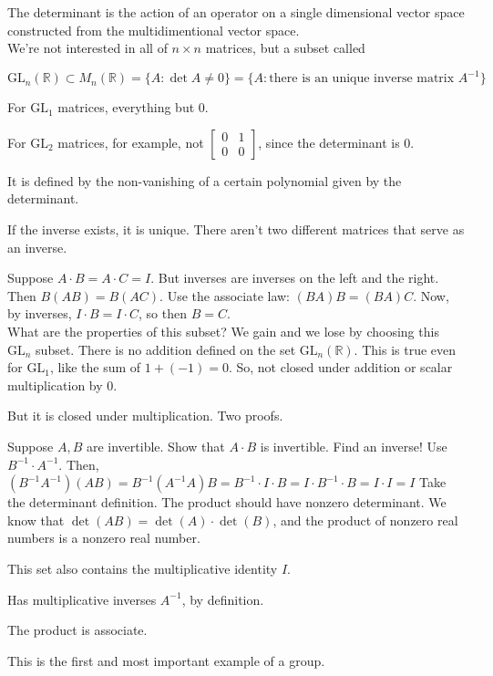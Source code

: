 \documentclass[12pt]{article}
\newcommand{\RR}{\mathbb{R}}
\newcommand{\GL}{\text{GL}}
\newcommand{\inv}[1]{#1^{-1}}}
\theoremstyle{definition}
\begin{document}
The determinant is the action of an operator on a single dimensional vector space constructed
from the multidimentional vector space.
\\

We're not interested in all of \(n \times n\) matrices, but a subset called

\(\GL_n(\RR)\subset M_n(\RR) = \{A: \det A\neq 0\} = \{A: \text{there is an unique inverse matrix }\inv{A}\}\)

For \(\GL_1\) matrices, everything but 0.

For \(\GL_2\) matrices, for example, not \(\left[\begin{smallmatrix}
    0 & 1\\
    0 & 0
\end{smallmatrix}\right]\), since the determinant is 0.

It is defined by the non-vanishing of a certain polynomial given by the determinant.

If the inverse exists, it is unique. There aren't two different matrices that serve as an inverse.

Suppose \(A\cdot B = A\cdot C = I\). But inverses are inverses on the left and the right.
Then \(B(AB) = B(AC)\). Use the associate law: \((BA)B = (BA)C\). Now, by inverses,
\(I\cdot B = I\cdot C\), so then \(B = C\).
\\

What are the properties of this subset? We gain and we lose by choosing this \(\GL_n\) subset. 
There is no addition defined on the set \(\GL_n(\RR)\).
This is true even for \(\GL_1\), like the sum of \(1 + (-1) = 0\).
So, not closed under addition or scalar multiplication by 0.

But it is closed under multiplication. Two proofs.

Suppose \(A, B\) are invertible. Show that \(A\cdot B\) is invertible. Find an inverse!
Use \(\inv{B}\cdot\inv{A}\). Then, \((\inv{B}\inv{A})(AB)=\inv{B}(\inv{A}A)B=\inv{B}\cdot I\cdot B=I\cdot\inv{B}\cdot B=I\cdot I=I\)
Take the determinant definition. The product should have nonzero determinant. We know that
\(\det(AB) = \det(A)\cdot\det(B)\), and the product of nonzero real numbers is a nonzero real number.

This set also contains the multiplicative identity \(I\).

Has multiplicative inverses \(\inv{A}\), by definition.

The product is associate.

This is the first and most important example of a group.
\\
\end{document}
